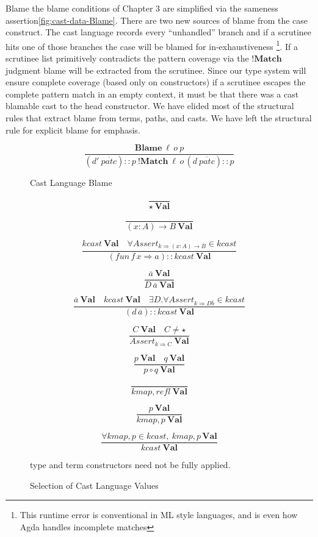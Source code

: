 Blame the blame conditions of Chapter 3 are simplified via the sameness
assertion\ref{fig:cast-data-Blame}. There are two new sources of
blame from the case construct. The cast language records every ``unhandled''
branch and if a scrutinee hits one of those branches the case will
be blamed for in-exhaustiveness \footnote{This runtime error is conventional in ML style languages, and is even
how Agda handles incomplete matches }. If a scrutinee list primitively contradicts the pattern coverage
via the $\mathbf{!Match}$ judgment blame will be extracted from the
scrutinee. Since our type system will ensure complete coverage (based
only on constructors) if a scrutinee escapes the complete pattern
match in an empty context, it must be that there was a cast blamable
cast to the head constructor. We have elided most of the structural
rules that extract blame from terms, paths, and casts. We have left
the structural rule for explicit blame for emphasis.

\begin{figure}

\[
\frac{\textbf{Blame}\:\ensuremath{\ell}\,o\ p}{\left(d'\ \overline{patc}\right)::p\ \mathbf{!Match}\ \ensuremath{\ell}\,o\,\left(d\ \overline{patc}\right)::p}
\]


\caption{Cast Language Blame}
\label{fig:cast-data-NoMatch}
\end{figure}

\begin{figure}
\[
\frac{\,}{\star\ \mathbf{Val}}
\]

\[
\frac{\,}{\left(x:A\right)\rightarrow B\ \mathbf{Val}}
\]

\[
\frac{kcast\ \mathbf{Val}\quad\forall Assert_{k\Rightarrow\left(x:A\right)\rightarrow B}\in kcast}{\left(fun\,f\,x\Rightarrow a\right)::kcast\ \mathbf{Val}}
\]


\[
\frac{\overline{a}\ \mathbf{Val}}{D\,\overline{a}\ \mathbf{Val}}
\]

\[
\frac{\overline{a}\ \mathbf{Val}\quad kcast\ \mathbf{Val}\quad\exists D.\forall Assert_{k\Rightarrow D\overline{b}}\in kcast}{\left(d\,\overline{a}\right)::kcast\ \mathbf{Val}}
\]


\[
\frac{C\ \mathbf{Val}\quad C\neq\star}{Assert_{k\Rightarrow C}\ \mathbf{Val}}
\]

\[
\frac{p\ \mathbf{Val}\quad q\ \mathbf{Val}}{p\circ q\ \mathbf{Val}}
\]

\[
\frac{\ }{kmap,refl\ \mathbf{Val}}
\]

\[
\frac{p\ \mathbf{Val}}{kmap,p\ \mathbf{Val}}
\]

\[
\frac{\forall kmap,p\in kcast,\ kmap,p\,\mathbf{Val}}{kcast\ \mathbf{Val}}
\]

type and term constructors need not be fully applied.

\caption{Selection of Cast Language Values}
\label{fig:cast-data-vals}
\end{figure}

